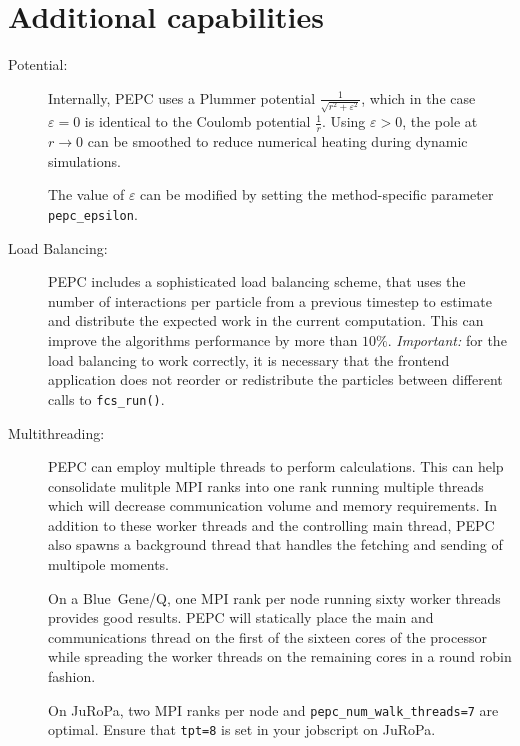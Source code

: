 \section*{Additional capabilities}

\begin{description}
  \item[Potential:] Internally, PEPC uses a Plummer potential $\frac{1}{\sqrt{r^2+\varepsilon^2}}$, 
    which in the case $\varepsilon = 0$ is identical to the Coulomb potential $\frac{1}{r}$. Using
    $\varepsilon > 0$, the pole at $r\rightarrow0$ can be smoothed to reduce numerical heating during
    dynamic simulations. 

    The value of $\varepsilon$ can be modified by setting the method-specific parameter \texttt{pepc\_epsilon}.

  \item[Load Balancing:] PEPC includes a sophisticated load balancing scheme, that uses
	the number of interactions per particle from a previous timestep to estimate and distribute the
	expected work in the current computation. This can improve the algorithms performance by more than $10\%$.
	\emph{Important:} for the load balancing to work correctly, it is necessary that the frontend application
        does not reorder or redistribute the particles between different calls to \texttt{fcs\_run()}.

  \item[Multithreading:] PEPC can employ multiple threads to perform calculations. This can help consolidate
        mulitple MPI ranks into one rank running multiple threads which will decrease communication
        volume and memory requirements. In addition to these worker threads and the controlling main thread,
        PEPC also spawns a background thread that handles the fetching and sending of multipole moments.

    On a Blue~Gene/Q, one MPI rank per node running sixty worker threads provides good results.
    PEPC will statically place the main and communications thread on the first of the sixteen cores of the
    processor while spreading the worker threads on the remaining cores in a round robin fashion.

    On JuRoPa, two MPI ranks per node and \texttt{pepc\_num\_walk\_threads=7} are optimal.
    Ensure that \texttt{tpt=8} is set in your jobscript on JuRoPa.

\end{description}



